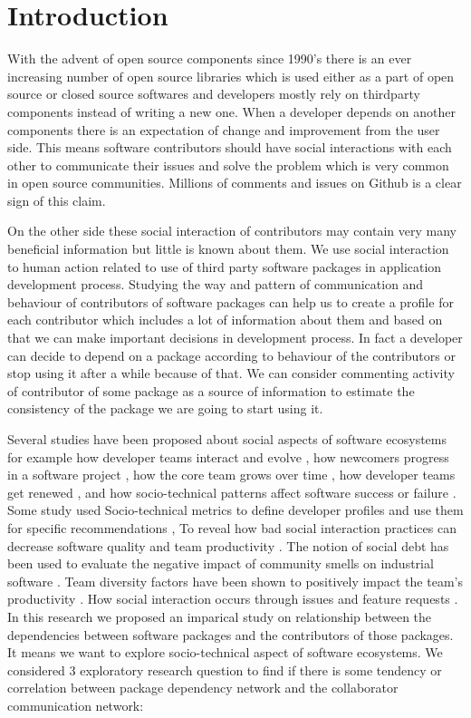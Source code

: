 

\section{Introduction}
With the advent of open source components since 1990's there is an ever increasing number of open source libraries which is used either as a part of open source or closed source softwares and developers mostly rely on thirdparty components instead of writing a new one.
When a developer depends on another components there is an expectation of change and improvement from the user side. This means software contributors should have social interactions with each other to communicate their issues and solve the problem which is very common in open source communities. Millions of comments and issues on Github is a clear sign of this claim.

On the other side these social interaction of contributors may contain very many beneficial information but little is known about them. We use social interaction to human action related to use of third party software packages in application development process. Studying the way and pattern of communication and behaviour of contributors of software packages can help us to create a profile for each contributor which includes a lot of information about them and based on that we can make important decisions in development process. In fact a developer can decide to depend on a package according to behaviour of the contributors or stop using it after a while because of that. We can consider commenting activity of contributor of some package as a source of information to estimate the consistency of the package we are going to start using it. 

Several studies have been proposed about social aspects of software ecosystems for example how developer teams interact and evolve \cite{lopezfernandez2006:sna}, how newcomers progress in a software project \cite{Zhou2011-ICSE,Zhou2012-ICSE}, how the core team grows over time \cite{Robles2009MSR}, how developer teams get renewed \cite{Constantinou2017SANER}, and how socio-technical patterns affect software success or failure \cite{SurianTLCL13}.  Some study used Socio-technical metrics to define developer profiles and use them for specific recommendations \cite{Kintab:2014:RSE:2735522.2735526}, To reveal how bad social interaction practices can decrease software quality and team productivity \cite{Zanetti2013CHASE}. The notion of social debt has been used to evaluate the negative impact of community smells on industrial software \cite{Tamburri2015}. Team diversity factors have been shown to positively impact the team’s productivity \cite{Vasilescu2015CHI}. How social interaction occurs through issues and feature requests \cite{8049385}. In this research we proposed an imparical study on relationship between the dependencies between software packages and the contributors of those packages. It means we want to explore socio-technical aspect of software ecosystems. We considered 3 exploratory research question to find if there is some tendency or correlation between package dependency network and the  collaborator communication network:

